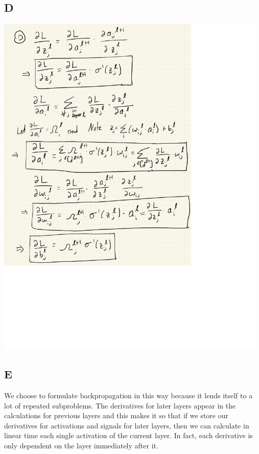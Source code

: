 \documentclass{article}
\begin{document}
\subsection{D}
\includegraphics[width=13cm]{../figs/Q2_d.pdf}
\subsection{E}
We choose to formulate backpropagation in this way because it lends itself to a lot of repeated subproblems. The derivatives for later layers appear in the calculations for previous layers and this makes it so that if we store our derivatives for activations and signals for later layers, then we can calculate in linear time each single activation of the current layer. In fact, each derivative is only dependent on the layer immediately after it.
\end{document}
